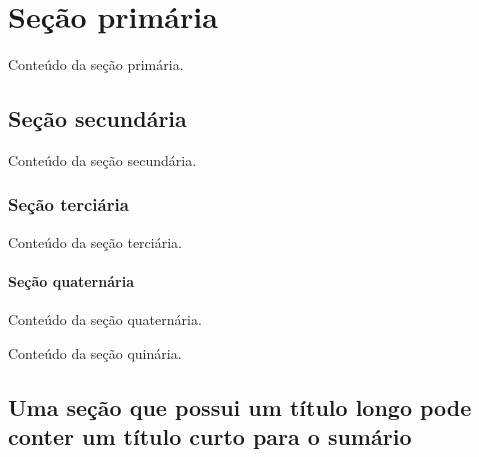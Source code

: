 \documentclass[serif, brazilian]{uffstex}
\begin{document}

\pretextual

\imprimircapa

\imprimirfolhaderosto

\listoffigures*
\cleardoublepage%

\pdfbookmark{\listalgoritmoname}{\algoritmoext}
\listofalgoritmos*
\cleardoublepage%

\listoftables*
\cleardoublepage%

\tableofcontents*
\cleardoublepage%

\textual

\chapter{Seção primária}

Conteúdo da seção primária.

\section{Seção secundária}

Conteúdo da seção secundária.

\subsection{Seção terciária}

Conteúdo da seção terciária.

\subsubsection{Seção quaternária}

Conteúdo da seção quaternária.


Conteúdo da seção quinária.

\section[Título curto]{Uma seção que possui um título longo
pode conter um título curto para o sumário}
\end{document}
